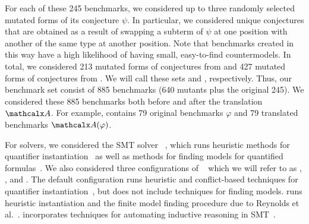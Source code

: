 For each of these 245 benchmarks, we considered up to three randomly selected
mutated forms of its conjecture $\psi$. In particular, we considered unique
conjectures that are obtained as a result of swapping a subterm of $\psi$ at
one position with another of the same type at another position.
Note that benchmarks created in this way have a high likelihood of having
small, easy-to-find countermodels. In total, we considered 213 mutated forms of
conjectures from \isa and 427 mutated forms of conjectures from \leon. We will
call these sets \isam and \leonm, respectively.
Thus, our benchmark set consist of 885 benchmarks (640 mutants plus the
original 245). We considered these 885 benchmarks both before and after the
translation~$\conv$. %
For example, \isa contains 79 original benchmarks $\varphi$ and 79 translated
benchmarks $\conv(\varphi)$.

For solvers, we considered the SMT solver \ziii~\cite{de-moura-bjoerner-2008},
which runs heuristic methods for quantifier instantiation~\cite{MouraBjoerner07}
as well as methods for finding models for quantified formulas~\cite{GeDeM-CAV-09}.
We also considered three configurations of \cvc~\cite{barrett-et-al-2011} which
we will refer to as \cvcd, \cvcf, and \cvci.
The default configuration \cvcd runs heuristic and conflict-based techniques for quantifier instantiation~\cite{ReynoldsTinelliMoura14},
but does not include techniques for finding models.
\cvcf runs heuristic instantiation and the finite model
finding procedure due to Reynolds et al.\ \cite{ReyEtAl-1-RR-13,reynolds-et-al-2013}.
\cvci incorporates techniques for automating inductive
reasoning in SMT~\cite{reynolds-kuncak-2015}.

